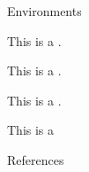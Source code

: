\documentclass[pdf, fleqn, compress]{beamer}
\begin{document}
\begin{frame}{Environments}
	\begin{definition}
		This is a .
	\end{definition}

	\begin{prop}
		This is a .
	\end{prop}

	\begin{theorem}
		This is a .
	\end{theorem}

	\begin{corollary}
		This is a 
	\end{corollary}
\end{frame}
\begin{nonavigation}
\appendix

\begin{frame}{References}
	\fontsize{8pt}{7.2}\selectfont
	
	
\end{frame}

\end{nonavigation}
\end{document}
